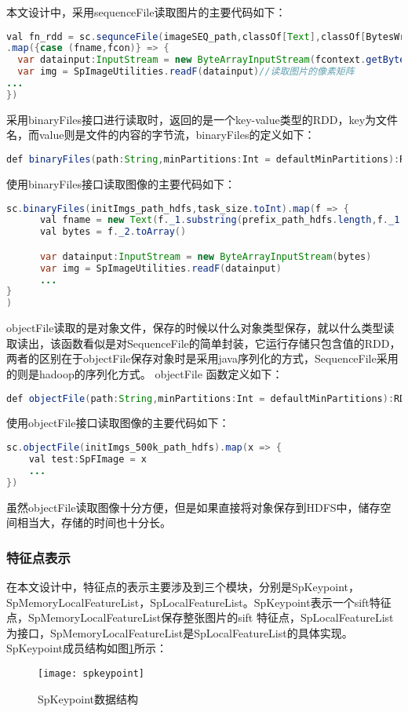 本文设计中，采用sequenceFile读取图片的主要代码如下：
\begin{lstlisting}[language=Java,numbers=none]
val fn_rdd = sc.sequnceFile(imageSEQ_path,classOf[Text],classOf[BytesWritable],task_size.toInt)
.map({case (fname,fcon)} => {
  var datainput:InputStream = new ByteArrayInputStream(fcontext.getBytes)
  var img = SpImageUtilities.readF(datainput)//读取图片的像素矩阵
...
})
\end{lstlisting}
采用binaryFiles接口进行读取时，返回的是一个key-value类型的RDD，key为文件名，而value则是文件的内容的字节流，binaryFiles的定义如下：
\begin{lstlisting}[language=Java,numbers=none]
def binaryFiles(path:String,minPartitions:Int = defaultMinPartitions):RDD[(String,PortableDataStream)]=withScope{}
\end{lstlisting}
使用binaryFiles接口读取图像的主要代码如下：
\begin{lstlisting}[language=Java,numbers=none]
 sc.binaryFiles(initImgs_path_hdfs,task_size.toInt).map(f => {
      val fname = new Text(f._1.substring(prefix_path_hdfs.length,f._1.length))//获取features key
      val bytes = f._2.toArray()

      var datainput:InputStream = new ByteArrayInputStream(bytes)
      var img = SpImageUtilities.readF(datainput)
      ...
}
)
\end{lstlisting}
objectFile读取的是对象文件，保存的时候以什么对象类型保存，就以什么类型读取读出，该函数看似是对SequenceFile的简单封装，它运行存储只包含值的RDD，两者的区别在于objectFile保存对象时是采用java序列化的方式，SequenceFile采用的则是hadoop的序列化方式。 objectFile 函数定义如下：
\begin{lstlisting}[language=Java,numbers=none]
def objectFile(path:String,minPartitions:Int = defaultMinPartitions):RDD[T]=withScope{}
\end{lstlisting}
使用objectFile接口读取图像的主要代码如下：
\begin{lstlisting}[language=Java,numbers=none,frame=none]
sc.objectFile(initImgs_500k_path_hdfs).map(x => {
    val test:SpFImage = x
    ...
})
\end{lstlisting}
虽然objectFile读取图像十分方便，但是如果直接将对象保存到HDFS中，储存空间相当大，存储的时间也十分长。
\subsubsection{特征点表示}
在本文设计中，特征点的表示主要涉及到三个模块，分别是SpKeypoint，SpMemoryLocalFeatureList，SpLocalFeatureList。SpKeypoint表示一个sift特征点，SpMemoryLocalFeatureList保存整张图片的sift 特征点，SpLocalFeatureList为接口，SpMemoryLocalFeatureList是SpLocalFeatureList的具体实现。SpKeypoint成员结构如图\ref{fig:spkeypoint}所示：
\begin{figure}[htp]
\centering
\texttt{[image: spkeypoint]}
\caption{SpKeypoint数据结构}
\label{fig:spkeypoint}
\end{figure}

